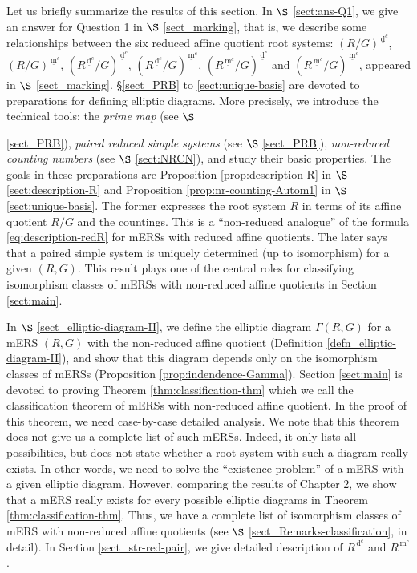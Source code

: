 \documentclass[11pt]{amsart}
\newcommand{\dc}{\,\underline{\mathrm{d}}^c}
\newcommand{\mc}{\, \underline{\mathrm{m}}^c}
\begin{document}
{Let us briefly summarize the results of this section.  
In $\S$ \ref{sect:ans-Q1}, we give an answer for
Question 1 in $\S$ \ref{sect_marking}, that is, 
we describe some relationships between the six reduced affine quotient root 
systems: $(R/G)^{\dc}$, $(R/G)^{\mc}$, $(R^{\dc}/G)^{\dc}$, $(R^{\dc}/G)^{\mc}$, 
$(R^{\mc}/G)^{\dc}$ and $(R^{\mc}/G)^{\mc}$, appeared in $\S$ \ref{sect_marking}. 
\S \ref{sect_PRB} to \ref{sect:unique-basis} are devoted to 
preparations for defining elliptic diagrams. More precisely, we introduce the technical 
tools: the {\it prime map} (see $\S$ {\ref{sect_PRB}), 
 {\it paired reduced simple systems} (see $\S$ \ref{sect_PRB}), 
 {\it non-reduced counting numbers} (see $\S$ \ref{sect:NRCN}), 
 and study their
basic properties. The goals in these preparations are Proposition 
\ref{prop:description-R} in $\S$ \ref{sect:description-R} and 
Proposition \ref{prop:nr-counting-Autom1} in $\S$ \ref{sect:unique-basis}. 
The former expresses the root system $R$ in terms of its affine quotient $R/G$ and 
the countings. {This} is  a ``non-reduced analogue'' of
the formula \eqref{eq:description-redR} for mERSs with reduced affine quotients. 
The later says that a paired simple system is uniquely determined (up to 
isomorphism) for a given $(R,G)$. This result plays one of the central roles for classifying 
isomorphism classes of mERSs with non-reduced affine quotients in Section
\ref{sect:main}. 
 
In $\S$ \ref{sect_elliptic-diagram-II}, we define the elliptic diagram $\Gamma(R,G)$
for a mERS $(R,G)$ with the non-reduced affine quotient (Definition 
\ref{defn_elliptic-diagram-II}), and show that this diagram depends only on the 
isomorphism classes of mERSs (Proposition \ref{prop:indendence-Gamma}).  
Section \ref{sect:main} is devoted to proving Theorem 
\ref{thm:classification-thm} which we call the classification theorem of mERSs with
non-reduced affine quotient. In the proof of this theorem, we need case-by-case detailed
analysis. We note that this theorem does not give us a complete list of such mERSs. 
Indeed, it only lists all possibilities, but does not state 
whether a root 
system with such a diagram really exists. In other words, we need to solve the 
``existence problem'' of 
a mERS with a given elliptic diagram. However, comparing
the results of Chapter 2, we show that a mERS really exists for every possible elliptic
diagrams in Theorem \ref{thm:classification-thm}. Thus, we have a complete list of 
isomorphism classes of mERS with non-reduced affine quotients (see $\S$ 
\ref{sect_Remarks-classification}, in detail).   
In Section \ref{sect_str-red-pair}, we give detailed description of $R^{\dc}$ and 
$R^{\mc}$. 
}


}
\end{document}
